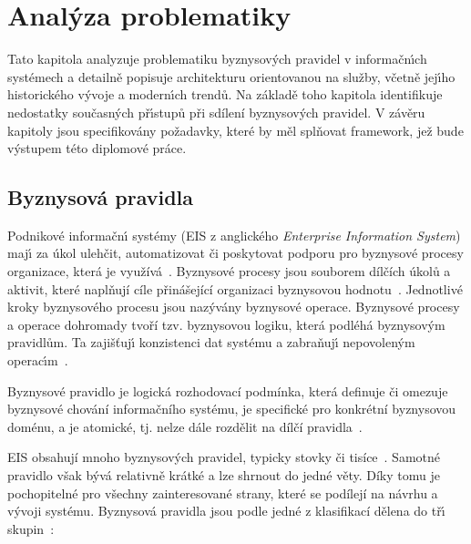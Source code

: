
\chapter{Anal\'yza problematiky}\label{ch:analyza}

Tato kapitola analyzuje problematiku byznysov\'ych pravidel v informačn\'{\i}ch systémech
a detailně popisuje architekturu orientovanou na služby, včetně jej\'{\i}ho historického
v\'yvoje a modern\'{\i}ch trendů. Na základě toho kapitola identifikuje nedostatky
současn\'ych př\'{\i}stupů při sdílení byznysových pravidel. V závěru kapitoly jsou
specifikovány požadavky, které by měl splňovat framework, jež bude v\'ystupem této diplomové práce.

\section{Byznysová pravidla}\label{sec:business-rules}

Podnikové informačn\'{\i} systémy (\gls{EIS} z anglického \textit{Enterprise Information System})
maj\'{\i} za úkol ulehčit, automatizovat či poskytovat podporu pro byznysové procesy organizace,
která je využívá~\cite{dumas2005process}. Byznysové procesy jsou souborem dílčích úkolů
a aktivit, které naplňují cíle přinášející organizaci byznysovou hodnotu~\cite{weske2012business}.
Jednotlivé kroky byznysového procesu jsou nazývány byznysové operace. Byznysové procesy a operace dohromady
tvoří tzv. byznysovou logiku, která podléhá byznysov\'ym pravidlům. Ta zajišťuj\'{\i} konzistenci dat
systému a zabraňuj\'{\i} nepovolen\'ym operac\'{\i}m~\cite{cemus2015automated}.

\begin{definition}
    Byznysové pravidlo je logická rozhodovací podmínka, která definuje či omezuje byznysové chování informačního systému,
    je specifické pro konkrétní byznysovou doménu, a je atomické, tj. nelze dále rozdělit na dílčí pravidla~\cite{cemus2015automated, morgan2002business}.
\end{definition}

\gls{EIS} obsahují mnoho byznysových pravidel, typicky stovky či tisíce~\cite{morgan2002business}.
Samotné pravidlo však bývá relativně krátké a lze shrnout do jedné věty. Díky tomu je pochopitelné
pro všechny zainteresované strany, které se podílejí na návrhu a vývoji systému.
Byznysová pravidla jsou podle jedné z klasifikací dělena do tř\'{\i} skupin~\cite{cemus2014aspect}:

